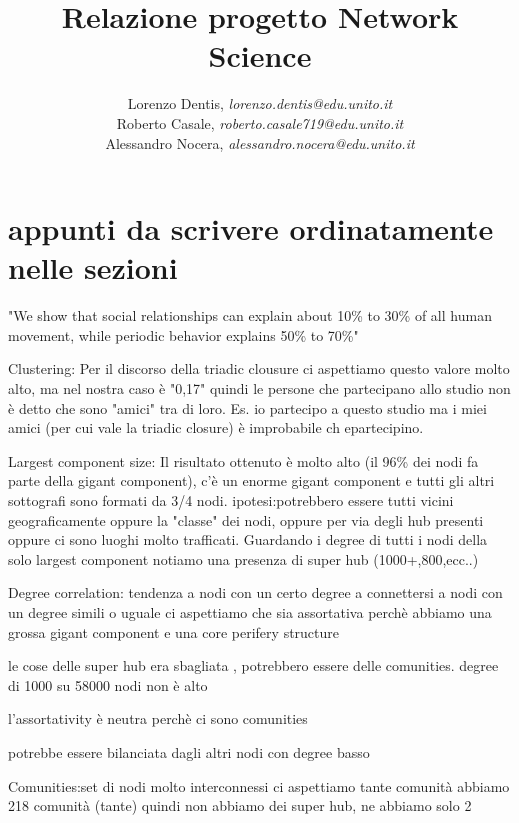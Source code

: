 \documentclass[a4paper]{article}
\begin{document}
\author{
	Lorenzo Dentis, \textit{lorenzo.dentis@edu.unito.it}\\
	Roberto Casale, \textit{roberto.casale719@edu.unito.it}\\
	Alessandro Nocera, \textit{alessandro.nocera@edu.unito.it}
}
\title{Relazione progetto Network Science}
\maketitle

\tableofcontents

\section{appunti da scrivere ordinatamente nelle sezioni}
"We show that social relationships can explain about 10\% to 30\% of all human movement, while periodic behavior explains 50\% to 70\%"

Clustering: Per il discorso della triadic clousure ci aspettiamo questo valore molto alto, ma nel nostra caso è "0,17" quindi le persone che partecipano allo studio non è detto che sono "amici" tra di loro.
Es. io partecipo a questo studio ma i miei amici (per cui vale la triadic closure) è improbabile ch epartecipino.

Largest component size: Il risultato ottenuto è molto alto (il 96\% dei nodi fa parte della gigant component), c'è un enorme gigant component e tutti gli altri sottografi sono formati da 3/4 nodi. ipotesi:potrebbero essere tutti vicini geograficamente oppure la "classe" dei nodi, oppure per via degli hub presenti oppure ci sono luoghi molto trafficati.
Guardando i degree di tutti i nodi della solo largest component notiamo una presenza di super hub (1000+,800,ecc..)

Degree correlation: tendenza a nodi con un certo degree a connettersi a nodi con un degree simili o uguale
ci aspettiamo che sia assortativa perchè abbiamo una grossa gigant component e una core perifery structure

le cose delle super hub era sbagliata , potrebbero essere delle comunities. degree di 1000 su 58000 nodi non è alto

l'assortativity è neutra perchè ci sono comunities


potrebbe essere bilanciata dagli altri nodi con degree basso


Comunities:set di nodi molto interconnessi
ci aspettiamo tante comunità
abbiamo 218 comunità (tante) quindi non abbiamo dei super hub, ne abbiamo solo 2
\end{document}

